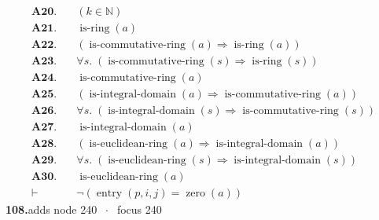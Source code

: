 \documentclass[11pt]{article}
\theoremstyle{plain}
\newcommand{\fit}[1]{\resizebox{\ifdim\width>\linewidth\linewidth\else\width\fi}{!}{#1}}
\begin{document}
\begin{align*}
  \mathbf{A20.}\quad & (k \in \mathbb{N}) \\
  \mathbf{A21.}\quad & \operatorname{is\text{-}ring}(a) \\
  \mathbf{A22.}\quad & (\operatorname{is\text{-}commutative\text{-}ring}(a) \Rightarrow \operatorname{is\text{-}ring}(a)) \\
  \mathbf{A23.}\quad & \forall s.\; (\operatorname{is\text{-}commutative\text{-}ring}(s) \Rightarrow \operatorname{is\text{-}ring}(s)) \\
  \mathbf{A24.}\quad & \operatorname{is\text{-}commutative\text{-}ring}(a) \\
  \mathbf{A25.}\quad & (\operatorname{is\text{-}integral\text{-}domain}(a) \Rightarrow \operatorname{is\text{-}commutative\text{-}ring}(a)) \\
  \mathbf{A26.}\quad & \forall s.\; (\operatorname{is\text{-}integral\text{-}domain}(s) \Rightarrow \operatorname{is\text{-}commutative\text{-}ring}(s)) \\
  \mathbf{A27.}\quad & \operatorname{is\text{-}integral\text{-}domain}(a) \\
  \mathbf{A28.}\quad & (\operatorname{is\text{-}euclidean\text{-}ring}(a) \Rightarrow \operatorname{is\text{-}integral\text{-}domain}(a)) \\
  \mathbf{A29.}\quad & \forall s.\; (\operatorname{is\text{-}euclidean\text{-}ring}(s) \Rightarrow \operatorname{is\text{-}integral\text{-}domain}(s)) \\
  \mathbf{A30.}\quad & \operatorname{is\text{-}euclidean\text{-}ring}(a) \\
  \vdash\quad & \neg (\operatorname{entry}(p, i, j) = \operatorname{zero}(a))
\end{align*}
\medskip\noindent\textbf{108.}\quad \fit{\texttt{(di)}}\hfill{\small adds node 240 $\;\cdot\;$ focus 240}\\[2pt]
\end{document}
